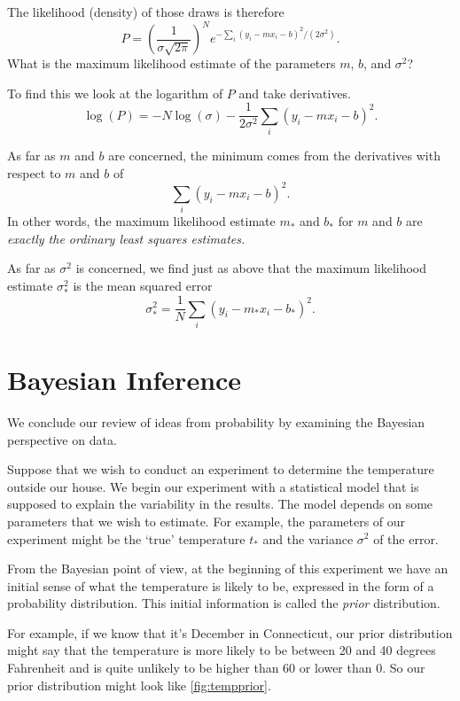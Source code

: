 \documentclass[
  oneside]{scrbook}
\begin{document}
The likelihood (density) of those draws is therefore \[
P = \left(\frac{1}{\sigma\sqrt{2\pi}}\right)^Ne^{-\sum_{i}(y_i-mx_i-b)^2/(2\sigma^2)}.
\] What is the maximum likelihood estimate of the parameters \(m\),
\(b\), and \(\sigma^2\)?

To find this we look at the logarithm of \(P\) and take derivatives. \[
\log(P) = -N\log(\sigma) -\frac{1}{2\sigma^2}\sum_{i}(y_i-mx_i-b)^2.
\]

As far as \(m\) and \(b\) are concerned, the minimum comes from the
derivatives with respect to \(m\) and \(b\) of \[
\sum_{i}(y_i-mx_i-b)^2.
\] In other words, the maximum likelihood estimate \(m_*\) and \(b_*\)
for \(m\) and \(b\) are \emph{exactly the ordinary least squares
estimates.}

As far as \(\sigma^2\) is concerned, we find just as above that the
maximum likelihood estimate \(\sigma^2_*\) is the mean squared error \[
\sigma^2_*=\frac{1}{N}\sum_{i}(y_i-m_*x_i-b_*)^2.
\]

\hypertarget{bayesian-inference}{%
\section{Bayesian Inference}\label{bayesian-inference}}

We conclude our review of ideas from probability by examining the
Bayesian perspective on data.

Suppose that we wish to conduct an experiment to determine the
temperature outside our house. We begin our experiment with a
statistical model that is supposed to explain the variability in the
results. The model depends on some parameters that we wish to estimate.
For example, the parameters of our experiment might be the `true'
temperature \(t_*\) and the variance \(\sigma^2\) of the error.

From the Bayesian point of view, at the beginning of this experiment we
have an initial sense of what the temperature is likely to be, expressed
in the form of a probability distribution. This initial information is
called the \emph{prior} distribution.

For example, if we know that it's December in Connecticut, our prior
distribution might say that the temperature is more likely to be between
20 and 40 degrees Fahrenheit and is quite unlikely to be higher than 60
or lower than 0. So our prior distribution might look like
\cref{fig:tempprior}.
\end{document}
